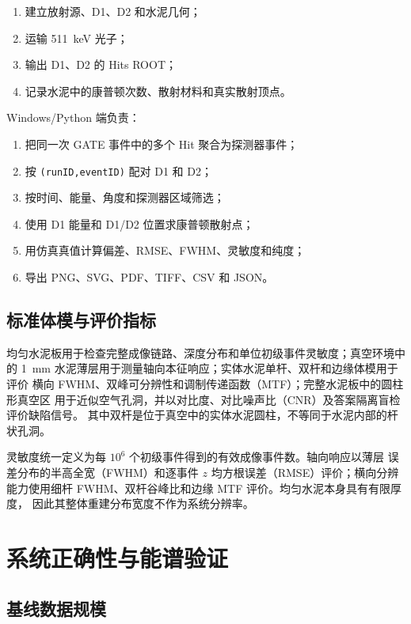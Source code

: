 \documentclass[UTF8,a4paper,zihao=-4,fontset=fandol]{ctexart}
\begin{document}
\begin{enumerate}
  \item 建立放射源、D1、D2 和水泥几何；
  \item 运输 511~keV 光子；
  \item 输出 D1、D2 的 Hits ROOT；
  \item 记录水泥中的康普顿次数、散射材料和真实散射顶点。
\end{enumerate}

Windows/Python 端负责：

\begin{enumerate}
  \item 把同一次 GATE 事件中的多个 Hit 聚合为探测器事件；
  \item 按 \texttt{(runID,eventID)} 配对 D1 和 D2；
  \item 按时间、能量、角度和探测器区域筛选；
  \item 使用 D1 能量和 D1/D2 位置求康普顿散射点；
  \item 用仿真真值计算偏差、RMSE、FWHM、灵敏度和纯度；
  \item 导出 PNG、SVG、PDF、TIFF、CSV 和 JSON。
\end{enumerate}

\subsection{标准体模与评价指标}

均匀水泥板用于检查完整成像链路、深度分布和单位初级事件灵敏度；真空环境中的
1~mm 水泥薄层用于测量轴向本征响应；实体水泥单杆、双杆和边缘体模用于评价
横向 FWHM、双峰可分辨性和调制传递函数（MTF）；完整水泥板中的圆柱形真空区
用于近似空气孔洞，并以对比度、对比噪声比（CNR）及答案隔离盲检评价缺陷信号。
其中双杆是位于真空中的实体水泥圆柱，不等同于水泥内部的杆状孔洞。

灵敏度统一定义为每 $10^6$ 个初级事件得到的有效成像事件数。轴向响应以薄层
误差分布的半高全宽（FWHM）和逐事件 $z$ 均方根误差（RMSE）评价；横向分辨
能力使用细杆 FWHM、双杆谷峰比和边缘 MTF 评价。均匀水泥本身具有有限厚度，
因此其整体重建分布宽度不作为系统分辨率。

\section{系统正确性与能谱验证}

\subsection{基线数据规模}
\end{document}
